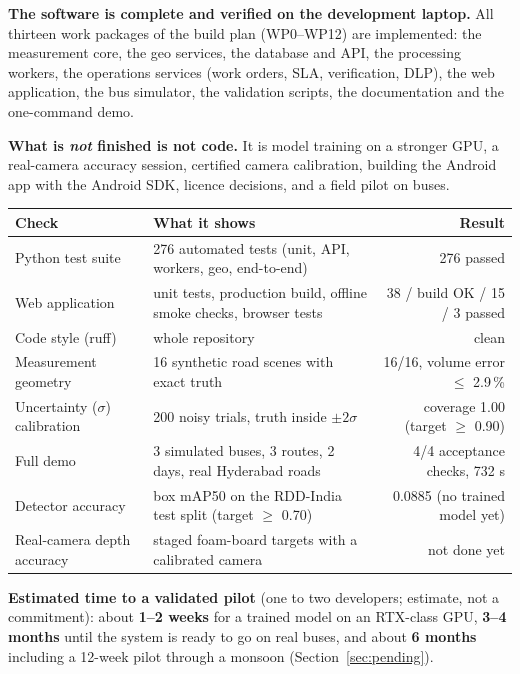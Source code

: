 \documentclass[11pt,a4paper]{article}
\begin{document}
\textbf{The software is complete and verified on the development laptop.} All thirteen work packages of the
build plan (WP0--WP12) are implemented: the measurement core, the geo services, the database and API, the
processing workers, the operations services (work orders, SLA, verification, DLP), the web application, the bus
simulator, the validation scripts, the documentation and the one-command demo.

\textbf{What is \emph{not} finished is not code.} It is model training on a stronger GPU, a real-camera accuracy
session, certified camera calibration, building the Android app with the Android SDK, licence decisions, and a
field pilot on buses.

\begin{center}
\begin{tabularx}{\textwidth}{@{}l X r@{}}
\toprule
\textbf{Check} & \textbf{What it shows} & \textbf{Result}\\
\midrule
Python test suite & 276 automated tests (unit, API, workers, geo, end-to-end) & \textcolor{gmok}{276 passed}\\
Web application & unit tests, production build, offline smoke checks, browser tests & \textcolor{gmok}{38 / build OK / 15 / 3 passed}\\
Code style (ruff) & whole repository & \textcolor{gmok}{clean}\\
Measurement geometry & 16 synthetic road scenes with exact truth & \textcolor{gmok}{16/16, volume error $\le$ 2.9\,\%}\\
Uncertainty ($\sigma$) calibration & 200 noisy trials, truth inside $\pm2\sigma$ & \textcolor{gmok}{coverage 1.00 (target $\ge$ 0.90)}\\
Full demo & 3 simulated buses, 3 routes, 2 days, real Hyderabad roads & \textcolor{gmok}{4/4 acceptance checks, 732 s}\\
Detector accuracy & box mAP50 on the RDD-India test split (target $\ge$ 0.70) & \textcolor{gmbad}{0.0885 (no trained model yet)}\\
Real-camera depth accuracy & staged foam-board targets with a calibrated camera & \textcolor{gmbad}{not done yet}\\
\bottomrule
\end{tabularx}
\end{center}

\textbf{Estimated time to a validated pilot} (one to two developers; estimate, not a commitment): about
\textbf{1--2 weeks} for a trained model on an RTX-class GPU, \textbf{3--4 months} until the system is ready to
go on real buses, and about \textbf{6 months} including a 12-week pilot through a monsoon
(Section~\ref{sec:pending}).
\end{document}

